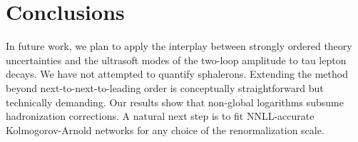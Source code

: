 \section{Conclusions}\label{sec:conclusions}

In future work, we plan to apply the interplay between strongly ordered
theory uncertainties and the ultrasoft modes of the two-loop amplitude
to tau lepton decays. We have not attempted to quantify sphalerons.
Extending the method beyond next-to-next-to-leading order is
conceptually straightforward but technically demanding. Our results show
that non-global logarithms subsume hadronization corrections. A natural
next step is to fit NNLL-accurate Kolmogorov-Arnold networks for any
choice of the renormalization scale.

